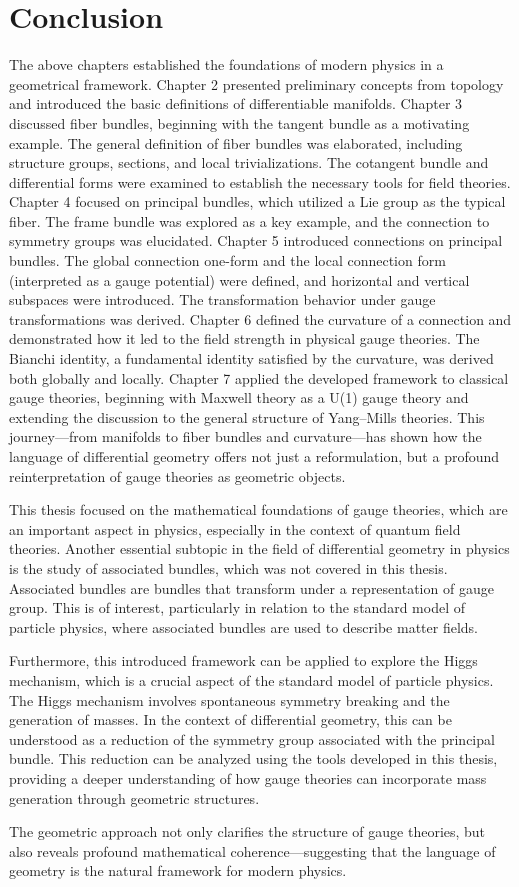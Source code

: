 
\chapter{Conclusion}

The above chapters established the foundations of modern physics in a geometrical framework. Chapter 2 presented preliminary concepts from topology and introduced the basic definitions of differentiable manifolds. Chapter 3 discussed fiber bundles, beginning with the tangent bundle as a motivating example. The general definition of fiber bundles was elaborated, including structure groups, sections, and local trivializations. The cotangent bundle and differential forms were examined to establish the necessary tools for field theories. Chapter 4 focused on principal bundles, which utilized a Lie group as the typical fiber. The frame bundle was explored as a key example, and the connection to symmetry groups was elucidated. Chapter 5 introduced connections on principal bundles. The global connection one-form and the local connection form (interpreted as a gauge potential) were defined, and horizontal and vertical subspaces were introduced. The transformation behavior under gauge transformations was derived. Chapter 6 defined the curvature of a connection and demonstrated how it led to the field strength in physical gauge theories. The Bianchi identity, a fundamental identity satisfied by the curvature, was derived both globally and locally. Chapter 7 applied the developed framework to classical gauge theories, beginning with Maxwell theory as a U(1) gauge theory and extending the discussion to the general structure of Yang–Mills theories. This journey—from manifolds to fiber bundles and curvature—has shown how the language of differential geometry offers not just a reformulation, but a profound reinterpretation of gauge theories as geometric objects.

This thesis focused on the mathematical foundations of gauge theories, which are an important aspect in physics, especially in the context of quantum field theories. Another essential subtopic in the field of differential geometry in physics is the study of associated bundles, which was not covered in this thesis. Associated bundles are bundles that transform under a representation of gauge group. This is of interest, particularly in relation to the standard model of particle physics, where associated bundles are used to describe matter fields.

Furthermore, this introduced framework can be applied to explore the Higgs mechanism, which is a crucial aspect of the standard model of particle physics. The Higgs mechanism involves spontaneous symmetry breaking and the generation of masses. In the context of differential geometry, this can be understood as a reduction of the symmetry group associated with the principal bundle. This reduction can be analyzed using the tools developed in this thesis, providing a deeper understanding of how gauge theories can incorporate mass generation through geometric structures.

The geometric approach not only clarifies the structure of gauge theories, but also reveals profound mathematical coherence—suggesting that the language of geometry is the natural framework for modern physics.
